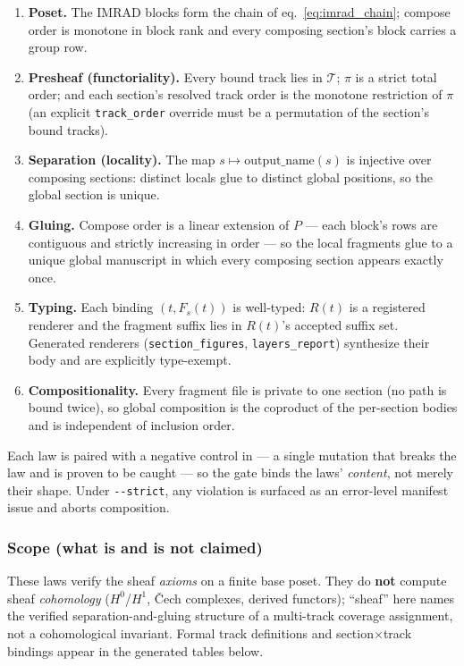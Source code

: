 \documentclass[
  english,
]{article}
\providecommand{\tightlist}{%
  \setlength{\itemsep}{0pt}\setlength{\parskip}{0pt}}
\begin{document}
\begin{enumerate}
\def\labelenumi{\arabic{enumi}.}
\tightlist
\item
  \textbf{Poset.} The IMRAD blocks form the chain of
  eq.~\ref{eq:imrad_chain}; compose order is monotone in block rank and
  every composing section's block carries a group row.
\item
  \textbf{Presheaf (functoriality).} Every bound track lies in
  \(\mathcal{T}\); \(\pi\) is a strict total order; and each section's
  resolved track order is the monotone restriction of \(\pi\) (an
  explicit \texttt{track\_order} override must be a permutation of the
  section's bound tracks).
\item
  \textbf{Separation (locality).} The map
  \(s \mapsto \mathrm{output\_name}(s)\) is injective over composing
  sections: distinct locals glue to distinct global positions, so the
  global section is unique.
\item
  \textbf{Gluing.} Compose order is a linear extension of \(P\) --- each
  block's rows are contiguous and strictly increasing in order --- so
  the local fragments glue to a unique global manuscript in which every
  composing section appears exactly once.
\item
  \textbf{Typing.} Each binding \((t, F_s(t))\) is well-typed: \(R(t)\)
  is a registered renderer and the fragment suffix lies in \(R(t)\)'s
  accepted suffix set. Generated renderers (\texttt{section\_figures},
  \texttt{layers\_report}) synthesize their body and are explicitly
  type-exempt.
\item
  \textbf{Compositionality.} Every fragment file is private to one
  section (no path is bound twice), so global composition is the
  coproduct of the per-section bodies and is independent of inclusion
  order.
\end{enumerate}

Each law is paired with a negative control in
 --- a single mutation that breaks
the law and is proven to be caught --- so the gate binds the laws'
\emph{content}, not merely their shape. Under \texttt{-\/-strict}, any
violation is surfaced as an error-level manifest issue and aborts
composition.

\subsubsection{Scope (what is and is not
claimed)}\label{scope-what-is-and-is-not-claimed}

These laws verify the sheaf \emph{axioms} on a finite base poset. They
do \textbf{not} compute sheaf \emph{cohomology} (\(H^0\)/\(H^1\), Čech
complexes, derived functors); ``sheaf'' here names the verified
separation-and-gluing structure of a multi-track coverage assignment,
not a cohomological invariant. Formal track definitions and
section\texorpdfstring{\ensuremath{\times}}{x}track bindings appear in the generated tables below.
\end{document}
